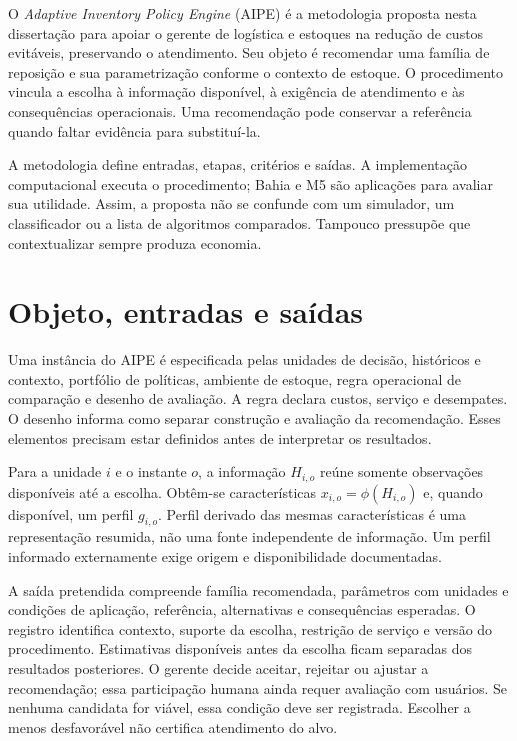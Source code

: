 
O \textit{Adaptive Inventory Policy Engine} (AIPE) é a metodologia proposta nesta dissertação para apoiar o gerente de logística e estoques na redução de custos evitáveis, preservando o atendimento. Seu objeto é recomendar uma família de reposição e sua parametrização conforme o contexto de estoque. O procedimento vincula a escolha à informação disponível, à exigência de atendimento e às consequências operacionais. Uma recomendação pode conservar a referência quando faltar evidência para substituí-la.

A metodologia define entradas, etapas, critérios e saídas. A implementação computacional executa o procedimento; Bahia e M5 são aplicações para avaliar sua utilidade. Assim, a proposta não se confunde com um simulador, um classificador ou a lista de algoritmos comparados. Tampouco pressupõe que contextualizar sempre produza economia.

\section{Objeto, entradas e saídas}
\label{sec:visao_geral_aipe}\label{sec:formulacao}
Uma instância do AIPE é especificada pelas unidades de decisão, históricos e contexto, portfólio de políticas, ambiente de estoque, regra operacional de comparação e desenho de avaliação. A regra declara custos, serviço e desempates. O desenho informa como separar construção e avaliação da recomendação. Esses elementos precisam estar definidos antes de interpretar os resultados.

Para a unidade $i$ e o instante $o$, a informação $H_{i,o}$ reúne somente observações disponíveis até a escolha. Obtêm-se características $x_{i,o}=\phi(H_{i,o})$ e, quando disponível, um perfil $g_{i,o}$. Perfil derivado das mesmas características é uma representação resumida, não uma fonte independente de informação. Um perfil informado externamente exige origem e disponibilidade documentadas.

A saída pretendida compreende família recomendada, parâmetros com unidades e condições de aplicação, referência, alternativas e consequências esperadas. O registro identifica contexto, suporte da escolha, restrição de serviço e versão do procedimento. Estimativas disponíveis antes da escolha ficam separadas dos resultados posteriores. O gerente decide aceitar, rejeitar ou ajustar a recomendação; essa participação humana ainda requer avaliação com usuários. Se nenhuma candidata for viável, essa condição deve ser registrada. Escolher a menos desfavorável não certifica atendimento do alvo.

